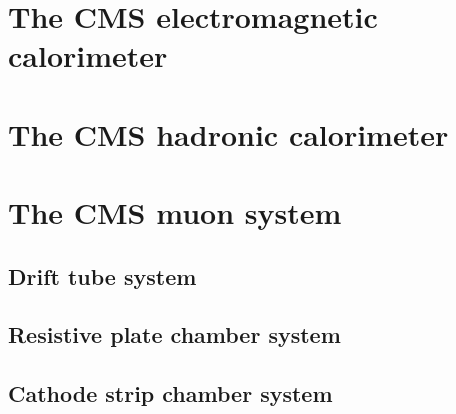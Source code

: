 \section{The CMS electromagnetic calorimeter}
\section{The CMS hadronic calorimeter}
\section{The CMS muon system}
\subsection{Drift tube system}
\subsection{Resistive plate chamber system}
\subsection{Cathode strip chamber system}

